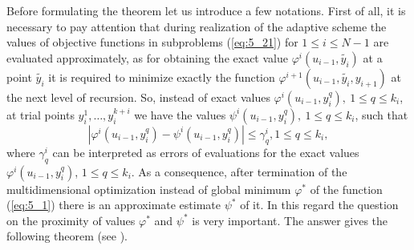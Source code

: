 Before formulating the theorem let us introduce a few notations. First of all, it is necessary to pay attention that during realization of the adaptive scheme the values of objective functions   in subproblems (\ref{eq:5_21}) for $1\leq i\leq N-1$   are evaluated approximately, as for obtaining the exact value $\varphi^i(u_{i-1},\tilde{y_i})$ at a 
point  $\tilde{y_i}$  it is required to minimize exactly the function $\varphi^{i+1}(u_{i-1},\tilde{y_i},y_{i+1})$  
at the next level of recursion. So, instead of exact values  $\varphi^i(u_{i-1},y_i^q),\:1\leq q\leq k_i$,   at trial 
points $y_i^1,\ldots,y_i^{k+i}$  we have the values  $\psi^i(u_{i-1},y_i^q),\:1\leq q\leq k_i$,  such that 
\begin{equation}
\label{eq:5_34}
\left|\varphi^i(u_{i-1},y_i^q)-\psi^i(u_{i-1},y_i^q)\right|\leq \gamma_q^i,1\leq q\leq k_i,
\end{equation}
where $\gamma_q^i$ can be interpreted as errors of evaluations for the exact values $\varphi^i(u_{i-1},y_i^q)$, $1\leq q\leq k_i$. As a consequence, after termination of the multidimensional optimization instead of global minimum $\varphi^*$  of the function (\ref{eq:5_1})  there is an approximate estimate $\psi^*$ of it. In this regard the question on the proximity of values $\varphi^*$ and  $\psi^*$ is very important. The answer gives the following theorem (see \cite{5_GerGriGer}).
